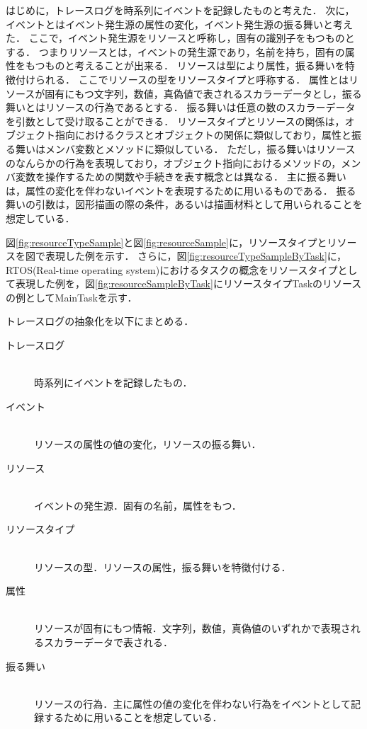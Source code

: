はじめに，トレースログを時系列にイベントを記録したものと考えた．
次に，イベントとはイベント発生源の属性の変化，イベント発生源の振る舞いと考えた．
ここで，イベント発生源をリソースと呼称し，固有の識別子をもつものとする．
つまりリソースとは，イベントの発生源であり，名前を持ち，固有の属性をもつものと考えることが出来る．
リソースは型により属性，振る舞いを特徴付けられる．
ここでリソースの型をリソースタイプと呼称する．
属性とはリソースが固有にもつ文字列，数値，真偽値で表されるスカラーデータとし，振る舞いとはリソースの行為であるとする．
振る舞いは任意の数のスカラーデータを引数として受け取ることができる．
リソースタイプとリソースの関係は，オブジェクト指向におけるクラスとオブジェクトの関係に類似しており，属性と振る舞いはメンバ変数とメソッドに類似している．
ただし，振る舞いはリソースのなんらかの行為を表現しており，オブジェクト指向におけるメソッドの，メンバ変数を操作するための関数や手続きを表す概念とは異なる．
主に振る舞いは，属性の変化を伴わないイベントを表現するために用いるものである．
振る舞いの引数は，図形描画の際の条件，あるいは描画材料として用いられることを想定している．

図\ref{fig:resourceTypeSample}と図\ref{fig:resourceSample}に，リソースタイプとリソースを図で表現した例を示す．
さらに，図\ref{fig:resourceTypeSampleByTask}に，RTOS(Real-time operating system)におけるタスクの概念をリソースタイプとして表現した例を，図\ref{fig:resourceSampleByTask}にリソースタイプTaskのリソースの例としてMainTaskを示す．

トレースログの抽象化を以下にまとめる．

\begin{description}
\item[トレースログ] \mbox{} \\
時系列にイベントを記録したもの．
\item[イベント] \mbox{} \\
リソースの属性の値の変化，リソースの振る舞い．
\item[リソース] \mbox{} \\
イベントの発生源．固有の名前，属性をもつ．
\item[リソースタイプ] \mbox{} \\
リソースの型．リソースの属性，振る舞いを特徴付ける．
\item[属性] \mbox{} \\
リソースが固有にもつ情報．文字列，数値，真偽値のいずれかで表現されるスカラーデータで表される．
\item[振る舞い] \mbox{} \\
リソースの行為．主に属性の値の変化を伴わない行為をイベントとして記録するために用いることを想定している．
\end{description}

